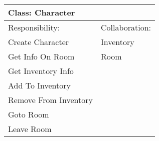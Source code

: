 \vspace{0.4cm}
\begin{tabular}{|p{7cm}|p{7cm}|} \hline
\multicolumn{2}{|l|}{Class:  Character} \\ \hline
Responsibility:  & Collaboration:  \\ \hline
 Create Character &  Inventory \\ 
 Get Info On Room &  Room \\ 
 Get Inventory Info &   \\ 
 Add To Inventory &   \\ 
 Remove From Inventory &   \\ 
 Goto Room &   \\ 
 Leave Room &   \\ 
\hline
\end{tabular}
\vspace{0.8cm}
